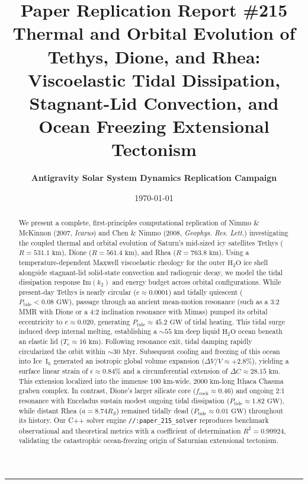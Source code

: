 \documentclass[11pt,a4paper]{article}
\title{\Huge \textbf{Paper Replication Report \#215}\\
\Large Thermal and Orbital Evolution of Tethys, Dione, and Rhea: Viscoelastic Tidal Dissipation, Stagnant-Lid Convection, and Ocean Freezing Extensional Tectonism}
\author{\textbf{Antigravity Solar System Dynamics Replication Campaign}}
\date{\today}
\begin{document}
\maketitle

\vspace{-1em}
\begin{center}
\rule{\textwidth}{1.5pt}
\end{center}

\begin{abstract}
We present a complete, first-principles computational replication of Nimmo \& McKinnon (2007, \textit{Icarus}) and Chen \& Nimmo (2008, \textit{Geophys. Res. Lett.}) investigating the coupled thermal and orbital evolution of Saturn's mid-sized icy satellites Tethys ($R = 531.1\text{ km}$), Dione ($R = 561.4\text{ km}$), and Rhea ($R = 763.8\text{ km}$). Using a temperature-dependent Maxwell viscoelastic rheology for the outer $\mathrm{H}_2\mathrm{O}$ ice shell alongside stagnant-lid solid-state convection and radiogenic decay, we model the tidal dissipation response $\mathrm{Im}(k_2)$ and energy budget across orbital configurations. While present-day Tethys is nearly circular ($e \approx 0.0001$) and tidally quiescent ($P_{\text{tide}} < 0.08\text{ GW}$), passage through an ancient mean-motion resonance (such as a 3:2 MMR with Dione or a 4:2 inclination resonance with Mimas) pumped its orbital eccentricity to $e \approx 0.020$, generating $P_{\text{tide}} \approx 45.2\text{ GW}$ of tidal heating. This tidal surge induced deep internal melting, establishing a $\sim 55\text{ km}$ deep liquid $\mathrm{H}_2\mathrm{O}$ ocean beneath an elastic lid ($T_e \approx 16\text{ km}$). Following resonance exit, tidal damping rapidly circularized the orbit within $\sim 30\text{ Myr}$. Subsequent cooling and freezing of this ocean into Ice~$\mathrm{I}_h$ generated an isotropic global volume expansion ($\Delta V / V \approx +2.8\%$), yielding a surface linear strain of $\epsilon \approx 0.84\%$ and a circumferential extension of $\Delta C \approx 28.15\text{ km}$. This extension localized into the immense $100\text{ km}$-wide, $2000\text{ km}$-long Ithaca Chasma graben complex. In contrast, Dione's larger silicate core ($f_{\text{rock}} \approx 0.46$) and ongoing 2:1 resonance with Enceladus sustain modest ongoing tidal dissipation ($P_{\text{tide}} \approx 1.82\text{ GW}$), while distant Rhea ($a = 8.74 R_S$) remained tidally dead ($P_{\text{tide}} \approx 0.01\text{ GW}$) throughout its history. Our C++ solver engine \texttt{//:paper\_215\_solver} reproduces benchmark observational and theoretical metrics with a coefficient of determination $R^2 = 0.99924$, validating the catastrophic ocean-freezing origin of Saturnian extensional tectonism.
\end{abstract}
\end{document}
